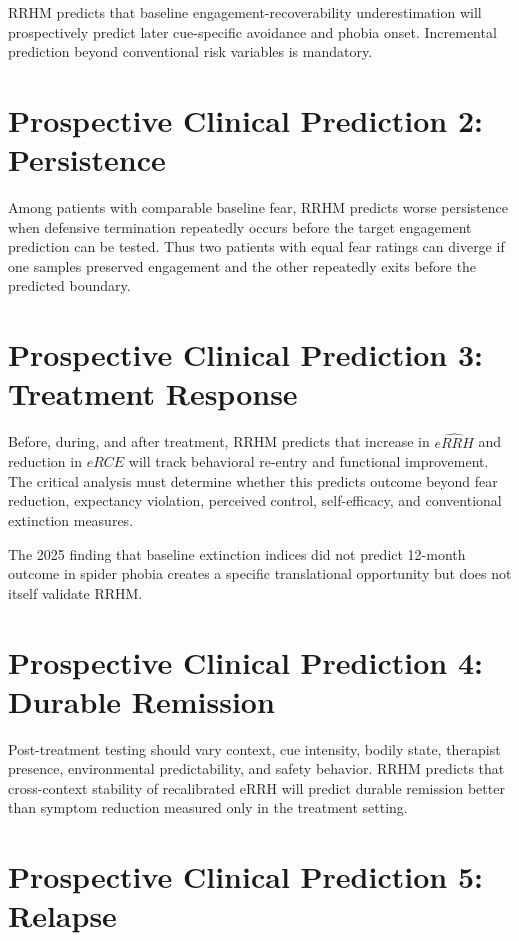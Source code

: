 \documentclass[11pt]{article}
\begin{document}
RRHM predicts that baseline engagement-recoverability underestimation will prospectively predict later cue-specific avoidance and phobia onset. Incremental prediction beyond conventional risk variables is mandatory.

\section{Prospective Clinical Prediction 2: Persistence}

Among patients with comparable baseline fear, RRHM predicts worse persistence when defensive termination repeatedly occurs before the target engagement prediction can be tested. Thus two patients with equal fear ratings can diverge if one samples preserved engagement and the other repeatedly exits before the predicted boundary.

\section{Prospective Clinical Prediction 3: Treatment Response}

Before, during, and after treatment, RRHM predicts that increase in $\widehat{eRRH}$ and reduction in $eRCE$ will track behavioral re-entry and functional improvement. The critical analysis must determine whether this predicts outcome beyond fear reduction, expectancy violation, perceived control, self-efficacy, and conventional extinction measures.

The 2025 finding that baseline extinction indices did not predict 12-month outcome in spider phobia \cite{devos2025} creates a specific translational opportunity but does not itself validate RRHM.

\section{Prospective Clinical Prediction 4: Durable Remission}

Post-treatment testing should vary context, cue intensity, bodily state, therapist presence, environmental predictability, and safety behavior. RRHM predicts that cross-context stability of recalibrated eRRH will predict durable remission better than symptom reduction measured only in the treatment setting.

\section{Prospective Clinical Prediction 5: Relapse}
\end{document}
